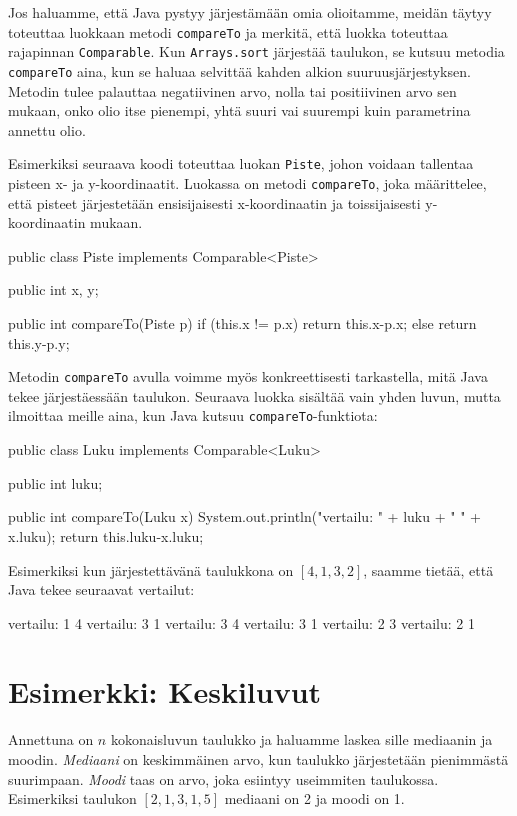 Jos haluamme, että Java pystyy järjestämään omia olioitamme,
meidän täytyy toteuttaa luokkaan metodi \texttt{compareTo} ja
merkitä, että luokka toteuttaa rajapinnan \texttt{Comparable}.
Kun \texttt{Arrays.sort} järjestää taulukon,
se kutsuu metodia \texttt{compareTo} aina, kun se haluaa selvittää
kahden alkion suuruusjärjestyksen.
Metodin tulee palauttaa negatiivinen arvo, nolla tai positiivinen arvo
sen mukaan, onko olio itse pienempi, yhtä suuri vai suurempi
kuin parametrina annettu olio.

Esimerkiksi seuraava koodi toteuttaa luokan \texttt{Piste},
johon voidaan tallentaa pisteen x- ja y-koordinaatit.
Luokassa on metodi \texttt{compareTo}, joka määrittelee,
että pisteet järjestetään ensisijaisesti x-koordinaatin ja
toissijaisesti y-koordinaatin mukaan.

\begin{code}
public class Piste implements Comparable<Piste> {
    public int x, y;

    public int compareTo(Piste p) {
        if (this.x != p.x) return this.x-p.x;
        else return this.y-p.y;
    }
}
\end{code}

Metodin \texttt{compareTo} avulla voimme myös konkreettisesti
tarkastella, mitä Java tekee järjestäessään taulukon.
Seuraava luokka sisältää vain yhden luvun,
mutta ilmoittaa meille aina, kun Java kutsuu
\texttt{compareTo}-funktiota:

\begin{code}
public class Luku implements Comparable<Luku> {
    public int luku;

    public int compareTo(Luku x) {
        System.out.println("vertailu: " + luku + " " + x.luku);
        return this.luku-x.luku;
    }
}
\end{code}

Esimerkiksi kun järjestettävänä taulukkona on $[4,1,3,2]$,
saamme tietää, että Java tekee seuraavat vertailut:

\begin{code}
vertailu: 1 4
vertailu: 3 1
vertailu: 3 4
vertailu: 3 1
vertailu: 2 3
vertailu: 2 1
\end{code}

\section{Esimerkki: Keskiluvut}

Annettuna on $n$ kokonaisluvun taulukko ja haluamme
laskea sille mediaanin ja moodin.
\emph{Mediaani} on keskimmäinen arvo, kun taulukko järjestetään
pienimmästä suurimpaan.
\emph{Moodi} taas on arvo, joka esiintyy useimmiten taulukossa.
Esimerkiksi taulukon $[2,1,3,1,5]$ mediaani on 2 ja moodi on 1.

